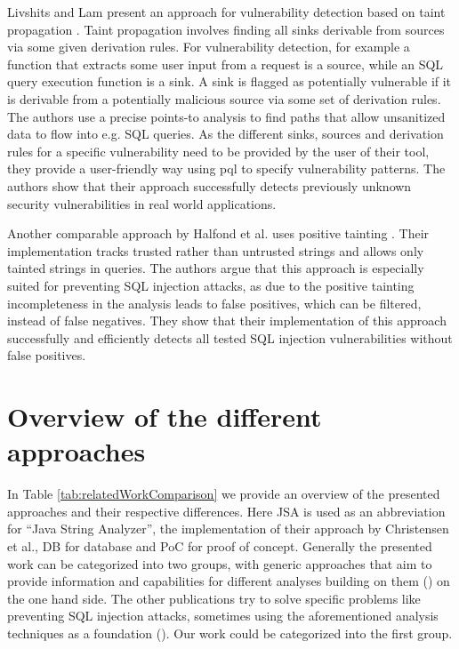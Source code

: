 Livshits and Lam present an approach for vulnerability detection based on taint propagation \cite{livshits2005}.
Taint propagation involves finding all sinks derivable from sources via some given derivation rules. For vulnerability detection, for example a function that extracts some user input from a request is a source, while an SQL query execution function is a sink. A sink is flagged as potentially vulnerable if it is derivable from a potentially malicious source via some set of derivation rules. The authors use a precise points-to analysis to find paths that allow unsanitized data to flow into e.g. SQL queries.
As the different sinks, sources and derivation rules for a specific vulnerability need to be provided by the user of their tool, they provide a user-friendly way using \ac{pql} to specify vulnerability patterns. 
The authors show that their approach successfully detects previously unknown security vulnerabilities in real world applications.

Another comparable approach by Halfond et al. uses positive tainting \cite{wasp}. Their implementation tracks trusted rather than untrusted strings and allows only tainted strings in queries. The authors argue that this approach is especially suited for preventing SQL injection attacks, as due to the positive tainting incompleteness in the analysis leads to false positives, which can be filtered, instead of false negatives. They show that their implementation of this approach successfully and efficiently detects all tested SQL injection vulnerabilities without false positives.

\section{Overview of the different approaches}

In Table \ref{tab:relatedWorkComparison} we provide an overview of the presented approaches and their respective differences. Here JSA is used as an abbreviation for \enquote{Java String Analyzer}, the implementation of their approach by Christensen et al., DB for database and PoC for proof of concept. Generally the presented work can be categorized into two groups, with generic approaches that aim to provide information and capabilities for different analyses building on them (\cite{brics,banshee,regex_types}) on the one hand side. The other publications try to solve specific problems like preventing SQL injection attacks, sometimes using the aforementioned analysis techniques as a foundation (\cite{gould2004static,amnesia,wasp,xduce,xact,livshits2005,sqli_wassermann_su}). Our work could be categorized into the first group.

